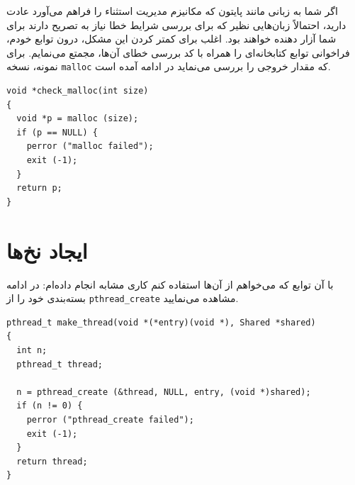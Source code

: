 \documentclass{book}
\begin{document}
    اگر شما به زبانی مانند پایتون که مکانیزم مدیریت استثناء را فراهم می‌آورد عادت دارید، احتمالاً زبان‌هایی نظیر  که 
    برای بررسی شرایط خطا نیاز به تصریح دارند برای شما آزار دهنده خواهند بود. 
    اغلب برای کمتر کردن این مشکل، درون توابع خودم، فراخوانی‌ توابع کتابخانه‌ای را همراه با کد بررسی خطای آن‌‌ها، مجمتع می‌نمایم. 
    برای نمونه، نسخه {\tt malloc} که مقدار خروجی را بررسی می‌نماید در ادامه آمده است. 

\begin{latin}
\begin{lstlisting}
void *check_malloc(int size)
{
  void *p = malloc (size);
  if (p == NULL) {
    perror ("malloc failed");
    exit (-1);
  }
  return p;
}
\end{lstlisting}
\end{latin}


\section{ ایجاد نخ‌ها}

    با آن توابع  که می‌خواهم از آن‌ها استفاده کنم کاری مشابه انجام داده‌ام: 
    در ادامه  بسته‌بندی خود را از {\tt pthread\_create} مشاهده می‌نمایید. 
    

\begin{latin}
\begin{lstlisting}[escapeinside={}]
pthread_t make_thread(void *(*entry)(void *), Shared *shared)
{
  int n;
  pthread_t thread;

  n = pthread_create (&thread, NULL, entry, (void *)shared);
  if (n != 0) {
    perror ("pthread_create failed");
    exit (-1);
  }
  return thread;
}
\end{lstlisting}
\end{latin}
\end{document}
